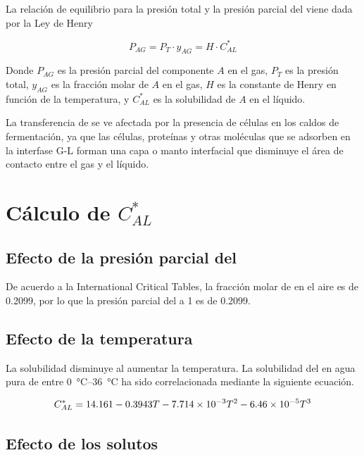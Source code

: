 \documentclass{AsignaturaResumen}
\begin{document}
La relación de equilibrio para la presión total y la presión parcial del  viene dada por la Ley de Henry

\begin{equation}
    P_{AG} = P_{T} \cdot y_{AG} = H \cdot C_{AL}^{\ast}
\end{equation}

Donde $P_{AG}$ es la presión parcial del componente $A$ en el gas, $P_{T}$ es la presión total, $y_{AG}$ es la fracción molar de $A$ en el gas, $H$ es la constante de Henry en función de la temperatura, y $C_{AL}^{\ast}$ es la solubilidad de $A$ en el líquido.

La transferencia de  se ve afectada por la presencia de células en los caldos de fermentación, ya que las células, proteínas y otras moléculas que se adsorben en la interfase G-L forman una capa o manto interfacial que disminuye el área de contacto entre el gas y el líquido.

\section{Cálculo de $C_{AL}^{\ast}$}

\subsection{Efecto de la presión parcial del }

De acuerdo a la International Critical Tables, la fracción molar de  en el aire es de 0.2099, por lo que la presión parcial del  a \qty{1}{\atm} es de \qty{0.2099}{\atm}.

\subsection{Efecto de la temperatura}

La solubilidad disminuye al aumentar la temperatura. La solubilidad del  en agua pura de entre \qtyrange{0}{36}{\degreeCelsius} ha sido correlacionada mediante la siguiente ecuación.

\begin{equation}
    C_{AL}^{\ast} = 14.161 - 0.3943T - \num{7.714d-3}T^{2} - \num{6.46d-5}T^{3}
\end{equation}

\subsection{Efecto de los solutos}
\end{document}

